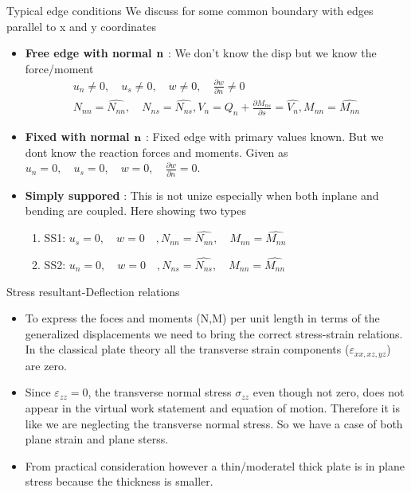	\begin{frame}{Typical edge conditions}
		We discuss for some common boundary with edges parallel to x and y coordinates
		\begin{itemize}
			\item \textbf{Free edge with normal $\mathbf{n}$} : We don't know the disp but we know the force/moment
			\begin{equation}
				\begin{aligned}
				u_n \neq 0, \quad u_s \neq 0, \quad w \neq 0, \quad \frac{\partial w}{\partial n} \neq 0 \\
				N_{nn} = \hat{N_{nn}}, \quad N_{ns} = \hat{N_{ns}}, V_n =  Q_n + \frac{\partial M_{ns}}{\partial s} = \hat{V_n}, M_{nn} = \hat{M_{nn}}
				\end{aligned}
			\end{equation}
			\item \textbf{Fixed with normal $\mathbf{n}$} : Fixed edge with primary values known. But we dont know the reaction forces and moments. Given as \\
			$u_n =0, \quad u_s =0,\quad w = 0,\quad \frac{\partial w}{\partial n} = 0 $. 
			\item \textbf{Simply suppored} : This is not unize especially when both inplane and bending are coupled. Here showing two types
			\begin{enumerate}
				\item SS1: $u_s = 0, \quad w =0 \quad, N_{nn}=\hat{N_{nn}}, \quad M_{nn} = \hat{M_{nn}}$
				\item SS2: $u_n = 0, \quad w =0 \quad, N_{ns}=\hat{N_{ns}}, \quad M_{nn} = \hat{M_{nn}}$
			\end{enumerate}
			
		\end{itemize}
	\end{frame}


	\begin{frame}{Stress resultant-Deflection relations}
		\begin{itemize}
			\item To express the foces and moments (N,M) per unit length in terms of the generalized displacements we need to bring the correct stress-strain relations. In the classical plate theory all the transverse strain components ($\varepsilon_{xx,xz,yz}$) are zero.
			\item  Since $\varepsilon_{zz} = 0$, the transverse normal stress $\sigma_{zz}$ even though not zero, does not appear in the virtual work statement and equation of motion. Therefore it is like we are neglecting the transverse normal stress. So we have a case of both plane strain and plane sterss.
			\item From practical consideration however a thin/moderatel thick plate is in plane stress because the thickness is smaller.
			
		\end{itemize}
	\end{frame}


